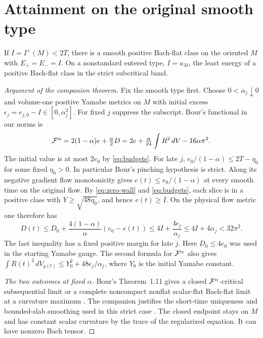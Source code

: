 \section{Attainment on the original smooth type}\label{sec:attainment}

\begin{theorem}
\label{thm:attainment}
If \(I=I^+(M)<2T\), there is a smooth positive Bach-flat class on
the oriented \(M\) with \(E_+=E_-=I\). On a nonstandard entered
type, \(I=a_M\), the least energy of a positive Bach-flat class in
the strict subcritical band.
\end{theorem}

\begin{proof}[Argument of the companion theorem]
Fix the smooth type first. Choose \(0<\alpha_j\downarrow0\) and
volume-one positive Yamabe metrics on \(M\) with initial excess
\(\epsilon_j=e_{j,0}-I\in[0,\alpha_j^2]\). For fixed \(j\) suppress
the subscript. Bour's functional in our norms is
\[
 {\cal F}^\alpha=2(1-\alpha)e+\tfrac{\alpha}{2}D
                =2e+\tfrac{\alpha}{24}\int R^2\,dV-16\alpha\pi^2 .
\]
The initial value is at most \(2e_0\) by \eqref{eq:budgets}. For late
\(j\), \(e_0/(1-\alpha)\le2T-\eta_0\) for some fixed \(\eta_0>0\).
In particular Bour's pinching hypothesis is strict. Along its negative gradient flow monotonicity gives
\(e(t)\le e_0/(1-\alpha)\) at every smooth time on the original flow.
By \eqref{eq:zero-wall} and \eqref{eq:budgets}, each slice is in a
positive class with \(Y\ge\sqrt{48\eta_0}\), and hence \(e(t)\ge I\).
On the physical flow metric one therefore has
\begin{equation}\label{eq:original-flow}
 D(t)\le D_0+\frac{4(1-\alpha)}{\alpha}(e_0-e(t))
       \le 4I+\frac{4\epsilon_j}{\alpha_j}
       \le 4I+4\alpha_j<32\pi^2 .
\end{equation}
The last inequality has a fixed positive margin for late \(j\).
Here \(D_0\le4e_0\) was used in the starting Yamabe gauge. The second
formula for \({\cal F}^\alpha\) also gives
\(\int R(t)^2\,dV_{g(t)}\le Y_0^2+48\epsilon_j/\alpha_j\), where
\(Y_0\) is the initial Yamabe constant.

\emph{The two outcomes at fixed \(\alpha\).}
Bour's Theorem~1.11 gives a closed \({\cal F}^\alpha\)-critical
subsequential limit or a complete noncompact nonflat scalar-flat
Bach-flat limit at a curvature maximum
\cite[Theorems 1.4, 1.9 and 1.11]{Bour2010FourthOrderCurvatureFlows}.
The companion justifies the short-time uniqueness and bounded-slab
smoothing used in this strict case \cite{BahuaudHelliwell2015Uniqueness,Baker2026BourAttainment}.
The closed endpoint stays on \(M\) and has constant scalar curvature
by the trace of the regularized equation. It can have nonzero Bach tensor.


\end{proof}
